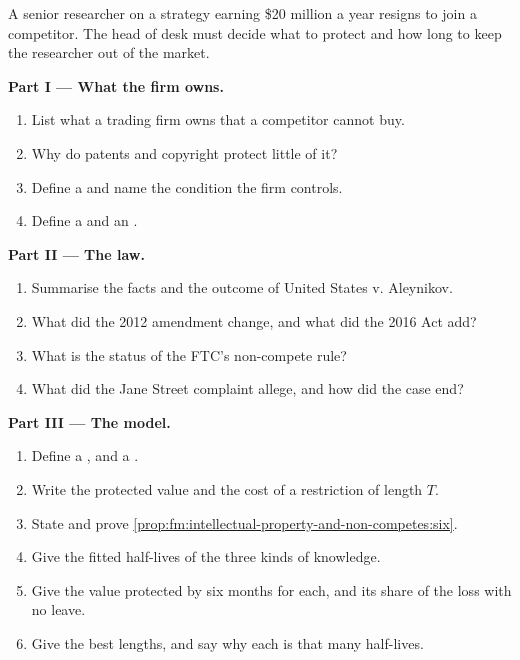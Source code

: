 \begin{problem}\label{pb:fm:intellectual-property-and-non-competes:1}
A senior researcher on a strategy earning \$20 million a year resigns to join a competitor. The head of desk must decide what to protect and
how long to keep the researcher out of the market.

\medskip\noindent\textbf{Part I --- What the firm owns.}
\begin{enumerate}
\item List what a trading firm owns that a competitor cannot buy.
\item Why do patents and copyright protect little of it?
\item Define a  and name the condition the firm controls.
\item Define a  and an .
\end{enumerate}

\medskip\noindent\textbf{Part II --- The law.}
\begin{enumerate}[resume]
\item Summarise the facts and the outcome of United States v. Aleynikov.
\item What did the 2012 amendment change, and what did the 2016 Act add?
\item What is the status of the FTC's non-compete rule?
\item What did the Jane Street complaint allege, and how did the case end?
\end{enumerate}

\medskip\noindent\textbf{Part III --- The model.}
\begin{enumerate}[resume]
\item Define a ,  and a .
\item Write the protected value and the cost of a restriction of length $T$.
\item State and prove \cref{prop:fm:intellectual-property-and-non-competes:six}.
\item Give the fitted half-lives of the three kinds of knowledge.
\item Give the value protected by six months for each, and its share of the loss with no leave.
\item Give the best lengths, and say why each is that many half-lives.
\end{enumerate}


\end{problem}
